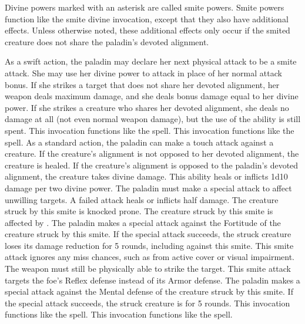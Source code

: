 Divine powers marked with an asterisk are called smite powers.
Smite powers function like the smite divine invocation, except that they also have additional effects.
Unless otherwise noted, these additional effects only occur if the smited creature does not share the paladin's devoted alignment.


As a swift action, the paladin may declare her next physical attack to be a smite attack.
She may use her divine power to attack in place of her normal attack bonus.
If she strikes a target that does not share her devoted alignment, her weapon deals maximum damage, and she deals bonus damage equal to her divine power.
If she strikes a creature who shares her devoted alignment, she deals no damage at all (not even normal weapon damage), but the use of the ability is still spent.
 This invocation functions like the  spell.
 This invocation functions like the  spell.
As a standard action, the paladin can make a touch attack against a creature.
If the creature's alignment is not opposed to her devoted alignment, the creature is healed.
If the creature's alignment is opposed to the paladin's devoted alignment, the creature takes divine damage.
This ability heals or inflicts 1d10 damage per two divine power.
The paladin must make a special attack to affect unwilling targets.
A failed attack heals or inflicts half damage.
The creature struck by this smite is knocked prone.
The creature struck by this smite is affected by .
The paladin makes a special attack against the Fortitude of the creature struck by this smite.
If the special attack succeeds, the struck creature loses its damage reduction for 5 rounds, including against this smite.
This smite attack ignores any miss chances, such as from active cover or visual impairment.
The weapon must still be physically able to strike the target.
This smite attack targets the foe's Reflex defense instead of its Armor defense.
The paladin makes a special attack against the Mental defense of the creature struck by this smite.
If the special attack succeeds, the struck creature is \dazed for 5 rounds.
 This invocation functions like the  spell.
 This invocation functions like the  spell.

